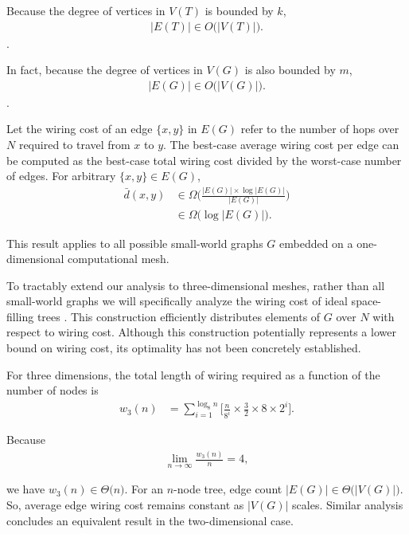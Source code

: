 Because the degree of vertices in $V(T)$ is bounded by $k$,
\begin{align*}
|E(T)| \in O \Big( |V(T)| \Big).
\end{align*}.

In fact, because the degree of vertices in $V(G)$ is also bounded by $m$,
\begin{align*}
|E(G)| \in O \Big( |V(G)| \Big).
\end{align*}.

Let the wiring cost of an edge $\{x, y\}$ in $E(G)$ refer to the number of hops over $N$ required to travel from $x$ to $y$.
The best-case average wiring cost per edge can be computed as the best-case total wiring cost divided by the worst-case number of edges.
For arbitrary $\{x, y\} \in E(G)$,
\begin{align*}
\bar{d}(x, y)
&\in \Omega \Big( \frac{ |E(G)| \times \log |E(G)| }{ |E(G)| } \Big)\\
&\in \Omega \Big( \log |E(G)| \Big).
\end{align*}

This result applies to all possible small-world graphs $G$ embedded on a one-dimensional computational mesh.

To tractably extend our analysis to three-dimensional meshes, rather than all small-world graphs we will specifically analyze the wiring cost of ideal space-filling trees \citep{kuffner2009space}.
This construction efficiently distributes elements of $G$ over $N$ with respect to wiring cost.
Although this construction potentially represents a lower bound on wiring cost, its optimality has not been concretely established.

For three dimensions, the total length of wiring required as a function of the number of nodes is
\begin{align*}
w_3(n)
&=
\sum_{i=1}^{\log_8 n} \Big[
  \frac{n}{8^i} %
  \times
  \frac{3}{2} \times 8 \times 2^{i} %
\Big].
\end{align*}

Because
\begin{align*}
\lim_{n \rightarrow \infty}
\frac{w_3(n)}{n} = 4,
\end{align*}

we have $w_3(n) \in \Theta \Big( n \Big)$.
For an $n$-node tree, edge count $|E(G)| \in \Theta \Big( |V(G)| \Big)$.
So, average edge wiring cost remains constant as $|V(G)|$ scales.
Similar analysis concludes an equivalent result in the two-dimensional case.

